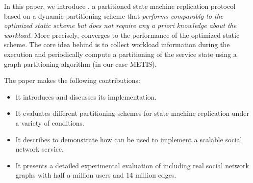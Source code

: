 In this paper, we introduce \dynastar, a partitioned state machine replication protocol based on a dynamic partitioning scheme that \emph{performs comparably to the optimized static scheme but does not require any a priori knowledge about the workload}.
More precisely, \dynastar converges to the performance of the optimized static scheme.
The core idea behind \dynastar is to collect workload information during the execution and periodically compute a partitioning of the service state using a graph partitioning algorithm (in our case METIS).
%
%
%
%


\vspace{30mm}

The paper makes the following contributions:
\begin{itemize}
\item It introduces \dynastar and discusses its implementation. 
\item It evaluates different partitioning schemes for state machine replication under a variety of conditions.
\item It describes \appname{} to demonstrate how \libname{} can be used to implement a scalable social network service.
\item It presents a detailed experimental evaluation of \dynastar including real social network graphs with half a million users and 14 million edges.
\end{itemize}

